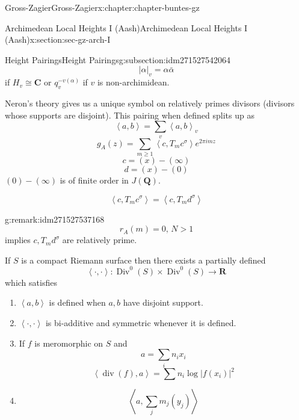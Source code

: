 \documentclass[oneside,10pt,]{book}
\numberwithin{equation}{section}
\newcommand{\pair}[2]{\left\langle #1, #2 \right\rangle}
\newcommand{\QQ}{\mathbf{Q}}
\newcommand{\RR}{\mathbf{R}}
\newcommand{\CC}{\mathbf{C}}
\DeclareMathOperator{\divisor}{div}
\DeclareMathOperator{\Div}{Div}
\newcommand{\gt}{>}
\begin{document}
\begin{chapterptx}{Gross-Zagier}{}{Gross-Zagier}{}{}{x:chapter:chapter-buntes-gz}
\begin{sectionptx}{Archimedean Local Heights I (Aash)}{}{Archimedean Local Heights I (Aash)}{}{}{x:section:sec-gz-arch-I}
\begin{subsectionptx}{Height Pairings}{}{Height Pairings}{}{}{g:subsection:idm271527542064}
\begin{equation*}
|\alpha |_v = \alpha \bar \alpha
\end{equation*}
if \(H_v \cong \CC\) or \(q_v^{-v(\alpha )}\) if \(v\) is non-archimidean.%
\par
Neron's theory gives us a unique symbol on relatively primes divisors (divisors whose supports are disjoint). This pairing when defined splits up as%
\begin{equation*}
\pair ab = \sum_v \pair ab_v
\end{equation*}
%
\begin{equation*}
g_A(z) = \sum_{m\ge1} \pair c{ T_m c^\sigma } e^{2\pi  i m z}
\end{equation*}
%
\begin{equation*}
c=(x) - (\infty )
\end{equation*}
%
\begin{equation*}
d = (x) - (0)
\end{equation*}
\((0)-(\infty )\) is of finite order in \(J(\QQ)\).%
\par
%
\begin{equation*}
\pair c{T_m c^\sigma } = \pair c {T_m d^\sigma }
\end{equation*}
%
\begin{remark}{}{g:remark:idm271527537168}%
%
\begin{equation*}
r_A(m) = 0,\, N \gt1
\end{equation*}
implies \(c,T_m d^\sigma\)  are relatively prime.%
\end{remark}
If \(S\) is a compact Riemann surface then there exists a partially defined%
\begin{equation*}
\pair \cdot \cdot \colon  \Div^0(S) \times \Div^0(S) \to \RR
\end{equation*}
which satisfies%
\begin{enumerate}
\item{}\(\pair ab\) is defined when \(a,b\) have disjoint support.%
\item{}\(\pair \cdot\cdot\) is bi-additive and symmetric whenever it is defined.%
\item{}If \(f\) is meromorphic on \(S\) and%
\begin{equation*}
a= \sum_i n_i x_i
\end{equation*}
%
\begin{equation*}
\pair{\divisor (f)} a = \sum n_i \log|f(x_i)|^2
\end{equation*}
%
\item{}%
\begin{equation*}
\pair a {\sum_j m_j (y_j)}

\end{equation*}
\end{enumerate}
\end{subsectionptx}
\end{sectionptx}
\end{chapterptx}
\end{document}
